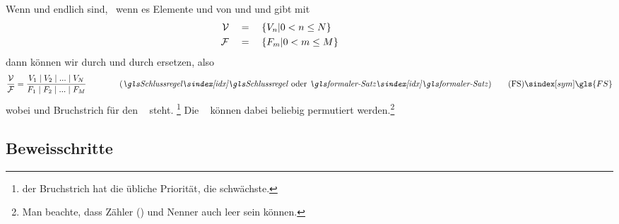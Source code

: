 Wenn \objqt{\Voraussetzungsmenge} und \objqt{\Folgerungsmenge} endlich sind, \textdh\ wenn es Elemente  und  von \objqt{\gsNo} und   und  gibt mit
\begin{align}
	\mathcal{V} & \quad = \quad \{V_n | 0 < n \le N \}
	\label{def:Voraussetzungen} \\
	\mathcal{F}     & \quad = \quad \{F_m     | 0 < m \le M \}
	\label{def:Folgerungen} &&&&&&&&&&
\end{align}
dann können wir \forqt{\Voraussetzungsmenge} durch  und \forqt{\Folgerungsmenge} durch  ersetzen, also \textzB\
\[
	\frac{\Voraussetzungsmenge}{\Folgerungsmenge} =
	\frac
		{\Voraussetzung_1 \srand \Voraussetzung_2 \srand ...\srand \Voraussetzung_N}
		{\Folgerung_1     \srand \Folgerung_2     \srand ...\srand \Folgerung_M    }
	\qquad \qquad \text{(\emph{\glsIdx{Schlussregel}} oder \emph{\glsIdx{formaler-Satz}})}
	\tag{\tagFS} \sym{\gls{FS}} \label{def:formalerSatz}
\]
wobei \symqt{\srand} und Bruchstrich für den  \objqt{\metaandsym} \textbzw\ \objqt{\metaimp} steht.%
\footnote{%
	der Bruchstrich hat die übliche Priorität, \objqt{\srand} die schwächste.%
}
Die  \textbzw\  können dabei beliebig permutiert werden.\footnote{%
	Man beachte, dass Zähler (\objqt{M=0}) und Nenner \objqt{N=0} auch leer sein können.
}

\subsection{Beweisschritte}%
\label{sub:Beweisschritte}

